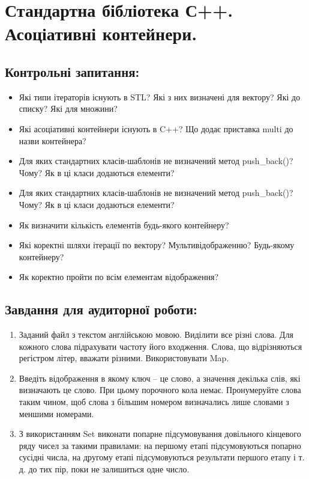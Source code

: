 \documentclass[a5paper,titlepage,openany,twoside,draft]{book_unv}%
\begin{document}
\chapter{Стандартна бібліотека С++. Асоціативні контейнери.}
%

\section{Контрольні запитання:}
\begin{itemize}
\item
Які типи ітераторів існують в STL? Які з них визначені для вектору? Які
до списку? Які для множини?
\item
Які асоціативні контейнери існують в C++? Що додає приставка multi до
назви контейнера?
\item
Для яких стандартних класів-шаблонів не визначений метод push\_back()?
Чому? Як в ці класи додаються елементи?
\item
Для яких стандартних класів-шаблонів не визначений метод push\_back()?
Чому? Як в ці класи додаються елементи?
\item
Як визначити кількість елементів будь-якого контейнеру?
\item
Які коректні шляхи ітерації по вектору? Мультивідображенню? Будь-якому
контейнеру?
\item
Як коректно пройти по всім елементам відображення?
\end{itemize}

\section{Завдання для аудиторної роботи:}

\begin{enumerate}
\def\labelenumi{\arabic{enumi})}
\item
  Заданий файл з текстом англійською мовою. Виділити все різні слова.
  Для кожного слова підрахувати частоту його входження. Слова, що
  відрізняються регістром літер, вважати різними. Використовувати Map.
\item
  Введіть відображення в якому ключ -- це слово, а значення декілька
  слів, які визначають це слово. При цьому порочного кола немає.
  Пронумеруйте слова таким чином, щоб слова з більшим номером
  визначались лише словами з меншими номерами.
\item
  З використанням Set виконати попарне підсумовування довільного
  кінцевого ряду чисел за такими правилами: на першому етапі
  підсумовуються попарно сусідні числа, на другому етапі підсумовуються
  результати першого етапу і т. д. до тих пір, поки не залишиться одне
  число.
\end{enumerate}
\end{document}
